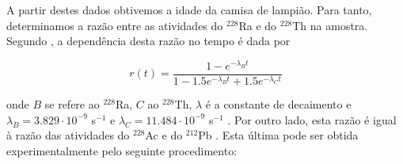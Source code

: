 \documentclass[a4paper, 11pt, notitlepage]{article}
\numberwithin{equation}{section}  %
\begin{document}
A partir destes dados obtivemos a idade da camisa de lampião. Para tanto, determinamos a razão entre as atividades do ${}^{228}$Ra e do ${}^{228}$Th na amostra. Segundo \cite{luetzelschwab1983}, a dependência desta razão no tempo é dada por

\begin{equation}
 r(t) = \frac{1 - e^{-\lambda_B t}}{1 - 1.5 e^{-\lambda_B t} + 1.5 e^{-\lambda_C t}}  \label{eq:razao.teorica}
\end{equation}

\noindent onde $B$ se refere ao ${}^{228}$Ra, $C$ ao ${}^{228}$Th, $\lambda$ é a constante de decaimento e $\lambda_B = 3.829 \cdot 10^{-9}$ s$^{-1}$ e $\lambda_C = 11.484 \cdot 10^{-9}$ s$^{-1}$ \cite{TabRad_v5,TabRad_v7}. Por outro lado, esta razão é igual à razão das atividades do ${}^{228}$Ac e do ${}^{212}$Pb \cite{peterson1996}. Esta última pode ser obtida experimentalmente pelo seguinte procedimento:
\end{document}

